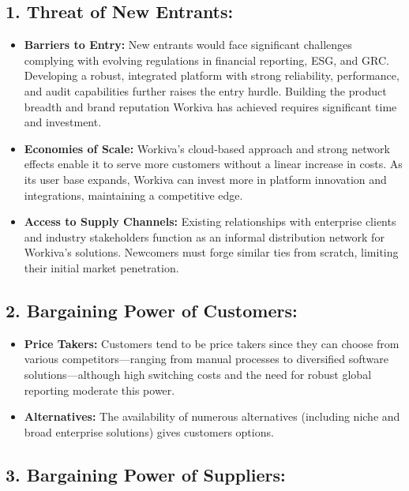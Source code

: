 \documentclass[
  10pt,
  a4paper,
]{article}
\providecommand{\tightlist}{%
  \setlength{\itemsep}{0pt}\setlength{\parskip}{0pt}}\usepackage{longtable,booktabs,array}
\begin{document}
\subsection{1. Threat of New Entrants:}\label{threat-of-new-entrants}

\begin{itemize}
\tightlist
\item
  \textbf{Barriers to Entry:} New entrants would face significant
  challenges complying with evolving regulations in financial reporting,
  ESG, and GRC. Developing a robust, integrated platform with strong
  reliability, performance, and audit capabilities further raises the
  entry hurdle. Building the product breadth and brand reputation
  Workiva has achieved requires significant time and investment.
\item
  \textbf{Economies of Scale:} Workiva's cloud-based approach and strong
  network effects enable it to serve more customers without a linear
  increase in costs. As its user base expands, Workiva can invest more
  in platform innovation and integrations, maintaining a competitive
  edge.
\item
  \textbf{Access to Supply Channels:} Existing relationships with
  enterprise clients and industry stakeholders function as an informal
  distribution network for Workiva's solutions. Newcomers must forge
  similar ties from scratch, limiting their initial market penetration.
\end{itemize}

\subsection{2. Bargaining Power of
Customers:}\label{bargaining-power-of-customers}

\begin{itemize}
\tightlist
\item
  \textbf{Price Takers:} Customers tend to be price takers since they
  can choose from various competitors---ranging from manual processes to
  diversified software solutions---although high switching costs and the
  need for robust global reporting moderate this power.
\item
  \textbf{Alternatives:} The availability of numerous alternatives
  (including niche and broad enterprise solutions) gives customers
  options.
\end{itemize}

\subsection{3. Bargaining Power of
Suppliers:}\label{bargaining-power-of-suppliers}
\end{document}
